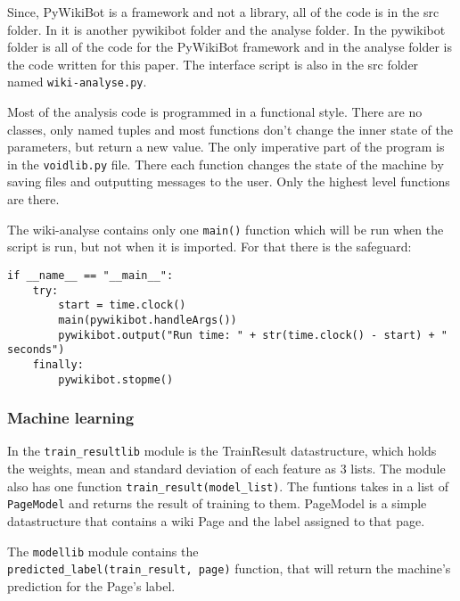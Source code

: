Since, PyWikiBot is a framework and not a library, all of the code is in the
src folder. In it is another pywikibot folder and the analyse folder.
In the pywikibot folder is all of the code for the PyWikiBot framework and in
the analyse folder is the code written for this paper. The interface script is
also in the src folder named \verb;wiki-analyse.py;.

Most of the analysis code is programmed in a functional style. There are
no classes, only named tuples and most functions don't change the inner state of
the parameters, but return a new value. The only imperative part of the program
is in the \verb;voidlib.py; file. There each function changes the state of the
machine by saving files and outputting messages to the user. Only the highest
level functions are there.

The wiki-analyse contains only one \verb;main(); function which will be run
when the script is run, but not when it is imported. For that there is the
safeguard:
\begin{verbatim}
if __name__ == "__main__":
    try:
        start = time.clock()
        main(pywikibot.handleArgs())
        pywikibot.output("Run time: " + str(time.clock() - start) + " seconds")
    finally:
        pywikibot.stopme()
\end{verbatim}

\subsubsection{Machine learning}

In the \verb;train_resultlib; module is the TrainResult datastructure, which
holds the weights, mean and standard deviation of each feature as 3 lists. The
module also has one function \verb;train_result(model_list);. The funtions
takes in a list of \verb;PageModel; and returns the result of training to them.
PageModel is a simple datastructure that contains a wiki Page and the label
assigned to that page.

The \verb;modellib; module contains the \\
\verb;predicted_label(train_result, page); function, that will return the
machine's prediction for the Page's label.

